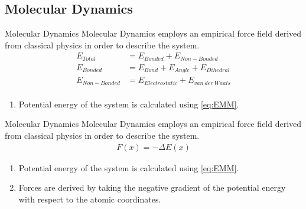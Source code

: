 \subsection{Molecular Dynamics}
\begin{frame}{Molecular Dynamics}
Molecular Dynamics employs an empirical force field derived from classical physics in order to describe the system.
\begin{equation}
\label{eq:EMM}
\begin{split}
E_{Total} & = E_{Bonded} + E_{Non-Bonded} \\
E_{Bonded} & = E_{Bond} + E_{Angle} + E_{Dihedral} \\
E_{Non-Bonded} & = E_{Electrostatic} + E_{van ~der ~Waals} \\
\end{split}
\end{equation}
\begin{enumerate}
\item Potential energy of the system is calculated using \cref{eq:EMM}.
\end{enumerate}

\end{frame}

\begin{frame}{Molecular Dynamics}
Molecular Dynamics employs an empirical force field derived from classical physics in order to describe the system.
\begin{equation}
\label{eq:EMM1}
\begin{split}
F(x) = - \Delta E(x)
\end{split}
\end{equation}
\begin{enumerate}
\item Potential energy of the system is calculated using \cref{eq:EMM}.
\item Forces are derived by taking the negative gradient of the potential energy with respect to the atomic coordinates.

\end{enumerate}

\end{frame}

